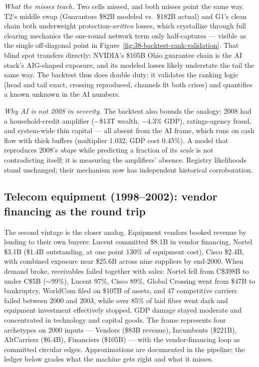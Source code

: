 \documentclass[11pt,a4paper]{article}
\begin{document}
\emph{What the misses teach.} Two cells missed, and both misses point the
same way. T2's middle swap (Guarantors \$82B modeled vs.\ \$182B
actual) and G1's clean chain both underweight protection-\emph{written}
losses, which crystallize through full clearing mechanics the one-round
network term only half-captures --- visible as the single off-diagonal
point in Figure~\ref{fig:38-backtest-rank-validation}. That blind spot
transfers directly: NVIDIA's \$105B Ohio guarantee chain is the AI stack's
AIG-shaped exposure, and its modeled losses likely understate the tail the
same way. The backtest thus does double duty: it validates the ranking
logic (head and tail exact, crossing reproduced, channels fit both crises)
and quantifies a known unknown in the AI numbers.

\emph{Why AI is not 2008 in severity.} The backtest also bounds the analogy:
2008 had a household-credit amplifier ($-$\$13T wealth, $-4.3\%$ GDP),
ratings-agency fraud, and system-wide thin capital --- all absent from the AI
frame, which runs on cash flow with thick buffers (multiplier 1.032, GDP
cost 0.45\%). A model that reproduces 2008's \emph{shape} while predicting a
fraction of its \emph{scale} is not contradicting itself; it is measuring
the amplifiers' absence. Registry likelihoods stand unchanged; their
mechanism now has independent historical corroboration.

\subsection{Telecom equipment (1998--2002): vendor financing as the round trip}\label{sec:telecom}
The second vintage is the closer analog. Equipment vendors booked revenue by
lending to their own buyers: Lucent committed \$8.1B in vendor financing,
Nortel \$3.1B (\$1.4B outstanding, at one point 130\% of equipment cost),
Cisco \$2.4B, with combined exposure near \$25.6B across nine suppliers by
end-2000. When demand broke, receivables failed together with sales: Nortel
fell from C\$398B to under C\$5B ($\sim$99\%), Lucent 97\%, Cisco 89\%,
Global Crossing went from \$47B to bankruptcy, WorldCom filed on \$107B of
assets, and 47 competitive carriers failed between 2000 and 2003, while over
85\% of laid fiber went dark and equipment investment effectively stopped.
GDP damage stayed moderate and concentrated in technology and capital goods.
The frame
represents four archetypes on 2000 inputs --- Vendors (\$83B revenue),
Incumbents (\$221B), AltCarriers (\$6.4B), Financiers (\$105B) --- with the
vendor-financing loop as committed circular edges. Approximations are
documented in the pipeline; the ledger below grades what the machine gets
right and what it misses.
\end{document}
